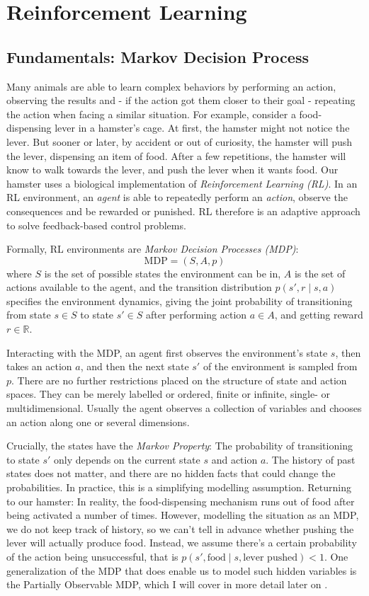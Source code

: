 \section{Reinforcement Learning}

\subsection{Fundamentals: Markov Decision Process}
Many animals are able to learn complex behaviors by performing an action, observing the results and - if the action got them closer to their goal - repeating the action when facing a similar situation.
For example, consider a food-dispensing lever in a hamster's cage. At first, the hamster might not notice the lever. But sooner or later, by accident or out of curiosity, the hamster will push the lever, dispensing an item of food. After a few repetitions, the hamster will know to walk towards the lever, and push the lever when it wants food.
Our hamster uses a biological implementation of \textit{Reinforcement Learning (RL)}.
In an RL environment, an \textit{agent} is able to repeatedly perform an \textit{action}, observe the consequences and be rewarded or punished.
RL therefore is an adaptive approach to solve feedback-based control problems.

Formally, RL environments are \textit{Markov Decision Processes (MDP)}:
$$ \text{MDP} = (S, A, p)$$
where $S$ is the set of possible states the environment can be in, $A$ is the set of actions available to the agent,
and the transition distribution $p(s', r \mid s, a)$ specifies the environment dynamics, giving the joint probability of transitioning from state $s \in S$ to state $s'\in S$ after performing action $a \in A$, and getting reward $r \in \mathbb{R}$.

Interacting with the MDP, an agent first observes the environment's state $s$, then takes an action $a$, and then the next state $s'$ of the environment is sampled from $p$.
There are no further restrictions placed on the structure of state and action spaces. They can be merely labelled or ordered, finite or infinite, single- or multidimensional.
Usually the agent observes a collection of variables and chooses an action along one or several dimensions.

Crucially, the states have the \textit{Markov Property}: The probability of transitioning to state $s'$ only depends on the current state $s$ and action $a$.
The history of past states does not matter, and there are no hidden facts that could change the probabilities.
In practice, this is a simplifying modelling assumption.
Returning to our hamster: In reality, the food-dispensing mechanism runs out of food after being activated a number of times. However, modelling the situation as an MDP, we do not keep track of history, so we can't tell in advance whether pushing the lever will actually produce food. Instead, we assume there's a certain probability of the action being unsuccessful, that is $p(s', \text{food} \mid s, \text{lever pushed}) < 1$.
One generalization of the MDP that does enable us to model such hidden variables is the Partially Observable MDP, which I will cover in more detail later on .

